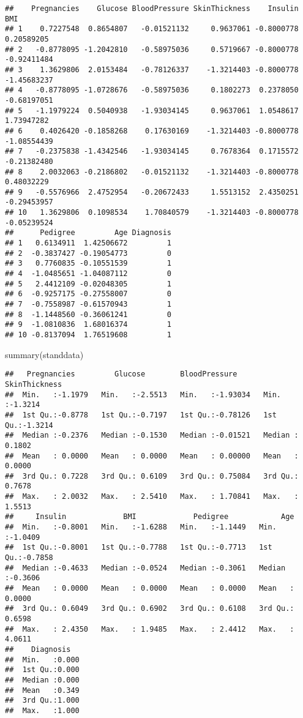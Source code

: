 \documentclass[
]{article}
\newenvironment{Shaded}{\begin{snugshade}}{\end{snugshade}}
\newcommand{\FunctionTok}[1]{\textcolor[rgb]{0.00,0.00,0.00}{#1}}
\newcommand{\NormalTok}[1]{#1}
\begin{document}
\begin{verbatim}
##    Pregnancies    Glucose BloodPressure SkinThickness    Insulin         BMI
## 1    0.7227548  0.8654807   -0.01521132     0.9637061 -0.8000778  0.20589205
## 2   -0.8778095 -1.2042810   -0.58975036     0.5719667 -0.8000778 -0.92411484
## 3    1.3629806  2.0153484   -0.78126337    -1.3214403 -0.8000778 -1.45683237
## 4   -0.8778095 -1.0728676   -0.58975036     0.1802273  0.2378050 -0.68197051
## 5   -1.1979224  0.5040938   -1.93034145     0.9637061  1.0548617  1.73947282
## 6    0.4026420 -0.1858268    0.17630169    -1.3214403 -0.8000778 -1.08554439
## 7   -0.2375838 -1.4342546   -1.93034145     0.7678364  0.1715572 -0.21382480
## 8    2.0032063 -0.2186802   -0.01521132    -1.3214403 -0.8000778  0.48032229
## 9   -0.5576966  2.4752954   -0.20672433     1.5513152  2.4350251 -0.29453957
## 10   1.3629806  0.1098534    1.70840579    -1.3214403 -0.8000778 -0.05239524
##      Pedigree         Age Diagnosis
## 1   0.6134911  1.42506672         1
## 2  -0.3837427 -0.19054773         0
## 3   0.7760835 -0.10551539         1
## 4  -1.0485651 -1.04087112         0
## 5   2.4412109 -0.02048305         1
## 6  -0.9257175 -0.27558007         0
## 7  -0.7558987 -0.61570943         1
## 8  -1.1448560 -0.36061241         0
## 9  -1.0810836  1.68016374         1
## 10 -0.8137094  1.76519608         1
\end{verbatim}

\begin{Shaded}
\begin{Highlighting}[]
\FunctionTok{summary}\NormalTok{(standdata)}
\end{Highlighting}
\end{Shaded}

\begin{verbatim}
##   Pregnancies         Glucose        BloodPressure      SkinThickness    
##  Min.   :-1.1979   Min.   :-2.5513   Min.   :-1.93034   Min.   :-1.3214  
##  1st Qu.:-0.8778   1st Qu.:-0.7197   1st Qu.:-0.78126   1st Qu.:-1.3214  
##  Median :-0.2376   Median :-0.1530   Median :-0.01521   Median : 0.1802  
##  Mean   : 0.0000   Mean   : 0.0000   Mean   : 0.00000   Mean   : 0.0000  
##  3rd Qu.: 0.7228   3rd Qu.: 0.6109   3rd Qu.: 0.75084   3rd Qu.: 0.7678  
##  Max.   : 2.0032   Max.   : 2.5410   Max.   : 1.70841   Max.   : 1.5513  
##     Insulin             BMI             Pedigree            Age         
##  Min.   :-0.8001   Min.   :-1.6288   Min.   :-1.1449   Min.   :-1.0409  
##  1st Qu.:-0.8001   1st Qu.:-0.7788   1st Qu.:-0.7713   1st Qu.:-0.7858  
##  Median :-0.4633   Median :-0.0524   Median :-0.3061   Median :-0.3606  
##  Mean   : 0.0000   Mean   : 0.0000   Mean   : 0.0000   Mean   : 0.0000  
##  3rd Qu.: 0.6049   3rd Qu.: 0.6902   3rd Qu.: 0.6108   3rd Qu.: 0.6598  
##  Max.   : 2.4350   Max.   : 1.9485   Max.   : 2.4412   Max.   : 4.0611  
##    Diagnosis    
##  Min.   :0.000  
##  1st Qu.:0.000  
##  Median :0.000  
##  Mean   :0.349  
##  3rd Qu.:1.000  
##  Max.   :1.000
\end{verbatim}
\end{document}
